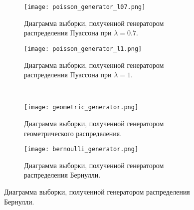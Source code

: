\begin{figure}[!h]
	\centering
	\begin{subfigure}[b]{0.45\textwidth}
		\texttt{[image: poisson\_generator\_l07.png]}
		\caption{Диаграмма выборки, полученной генератором распределения Пуассона при $\lambda = 0.7$.}
	\end{subfigure}
	\hfill
	\begin{subfigure}[b]{0.45\textwidth}
		\texttt{[image: poisson\_generator\_l1.png]}
		\caption{Диаграмма выборки, полученной генератором распределения Пуассона при $\lambda = 1$.}
	\end{subfigure}
	\\
	\begin{subfigure}[b]{0.45\textwidth}
		\texttt{[image: geometric\_generator.png]}
		\caption{Диаграмма выборки, полученной генератором геометрического распределения.}
	\end{subfigure}
	\hfill
	\begin{subfigure}[b]{0.45\textwidth}
		\texttt{[image: bernoulli\_generator.png]}
		\caption{Диаграмма выборки, полученной генератором распределения Бернулли.}
	\end{subfigure}
\end{figure}
